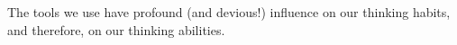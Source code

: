 \subsection{}
{

\begin{frame}{}
 
\LARGE 
The tools we use have profound (and devious!) influence on our 
thinking habits, and therefore, on our thinking abilities.
	
\end{frame}
}




